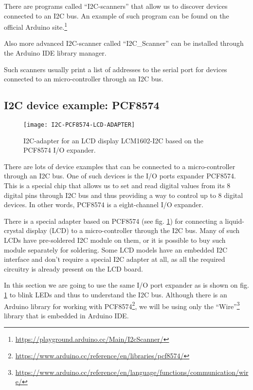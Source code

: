\documentclass[../sparc.tex]{subfiles}
\begin{document}
There are programs called ``I2C-scanners'' that allow us to discover devices
connected to an I2C bus. An example of such program can be found on the official
Arduino site.\footnote{\url{https://playground.arduino.cc/Main/I2cScanner/}}

Also more advanced I2C-scanner called ``I2C\_Scanner'' can be installed through
the Arduino IDE library manager.

Such scanners usually print a list of addresses to the serial port for devices
connected to an micro-controller through an I2C bus.

\subsection{I2C device example: PCF8574}

\begin{figure}[H]
  \centering
  \texttt{[image: I2C-PCF8574-LCD-ADAPTER]}
  \caption{I2C-adapter for an LCD display LCM1602-I2C based on the PCF8574 I/O
    expander.}
  \label{fig:i2c-pcf8574-lcd-adapter}
\end{figure}

There are lots of device examples that can be connected to a micro-controller
through an \gls{I2C} bus.  One of such devices is the I/O ports expander
PCF8574.  This is a special chip that allows us to set and read digital values
from its 8 digital pins through I2C bus and thus providing a way to control up
to 8 digital devices.  In other words, PCF8574 is a eight-channel I/O expander.

There is a special adapter based on PCF8574 (see
fig. \ref{fig:i2c-pcf8574-lcd-adapter}) for connecting a liquid-crystal display
(LCD) to a micro-controller through the I2C bus.  Many of such LCDs have
pre-soldered I2C module on them, or it is possible to buy such module separately
for soldering.  Some LCD models have an embedded I2C interface and don't require
a special I2C adapter at all, as all the required circuitry is already present
on the LCD board.

In this section we are going to use the same I/O port expander as is shown on
fig. \ref{fig:i2c-pcf8574-lcd-adapter} to blink LEDs and thus to understand the
I2C bus.  Although there is an Arduino library for working with
PCF8574\footnote{\url{https://www.arduino.cc/reference/en/libraries/pcf8574/}},
we will be using only the
``Wire''\footnote{\url{https://www.arduino.cc/reference/en/language/functions/communication/wire/}}
library that is embedded in Arduino IDE.
\end{document}
